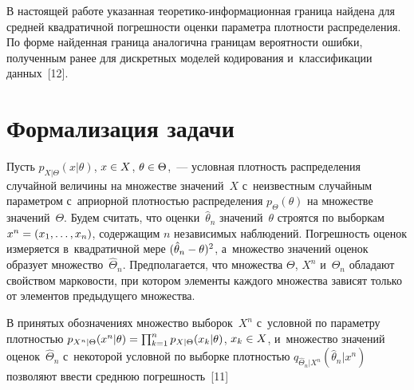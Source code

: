 \begin{multicols}{2}
В настоящей работе указанная тео\-ре\-ти\-ко-ин\-фор\-ма\-ци\-он\-ная граница найдена для 
средней квад\-ра\-тич\-ной по\-греш\-ности оцен\-ки па\-ра\-мет\-ра плот\-ности распределения. По форме 
найденная \mbox{граница} аналогична границам вероятности ошибки, полученным ранее для 
дискретных моделей кодирования и~классификации данных~[12].

\section{Формализация задачи}

Пусть $p_{X\vert\Theta} (x\vert\theta)$, $x\hm\in X$, $\theta\hm\in \Theta$,~--- условная 
плотность распределения случайной величины на множестве значений~$X$ с~неизвестным 
случайным па\-ра\-мет\-ром с~априорной плот\-ностью распределения $p_\Theta(\theta)$  на 
множестве значений~$\Theta$. Будем считать, что оценки~$\hat{\theta}_n$ значений~$\theta$ 
строятся по выборкам $x^n\hm= (x_1, \ldots , x_n)$, содержащим $n$ независимых наблюдений. 
Погрешность оценок измеряется в~квад\-ра\-тич\-ной мере $(\hat{\theta}_n\hm-\theta)^2$, 
а~множество значений оценок образует множество~$\hat{\Theta}_n$. Предполагается, что 
множества $\Theta$, $X^n$ и~$\hat{\Theta}_n$ обладают свойством марковости, при котором 
элементы каждого множества зависят только от элементов предыду\-ще\-го множества. 

В принятых обозначениях множество выборок~$X^n$ с~условной по па\-ра\-мет\-ру плот\-ностью 
$p_{X^n\vert\Theta} (x^n\vert\theta)\hm= \prod\nolimits^n_{k=1} p_{X\vert\Theta}(x_k\vert 
\theta)$, $x_k\hm\in X$, и~множество значений оценок~$\hat{\Theta}_n$ с~некоторой условной 
по выборке плот\-ностью $q_{\hat{\Theta}_n\vert X^n}(\hat{\theta}_n\vert x^n)$ поз\-во\-ля\-ют ввести сред\-нюю 
по\-греш\-ность~[11] 


\end{multicols}
